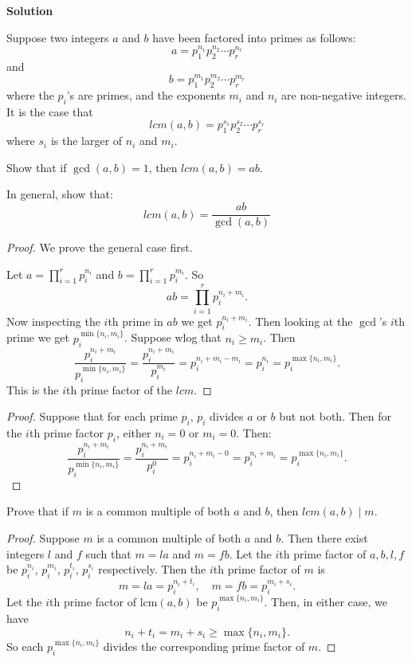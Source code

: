 \documentclass[8pt]{article}
\begin{document}
\textbf{Solution}

Suppose two integers $a$ and $b$ have been factored into primes as follows:
\[a = p_1^{n_1} p_2^{n_2} \cdots p_r^{n_r}\]
and 
\[b = p_1^{m_1} p_2^{m_2} \cdots p_r^{m_r}\]
where the $p_i$'s are primes, and the exponents $m_i$ and $n_i$ are non-negative 
integers. It is the case that 
\[lcm(a, b) = p_1^{s_1} p_2^{s_2} \cdots p_r^{s_r}\]
where $s_i$ is the larger of $n_i$ and $m_i$.

\begin{tcolorbox}[title=Problem 12, breakable]
    Show that if $\gcd(a, b) = 1$, then $lcm(a, b) = ab$.

    In general, show that:
    \[lcm(a, b) = \frac{ab}{\gcd(a, b)}\]
\end{tcolorbox}

\begin{proof}
    We prove the general case first.

    Let $a = \prod_{i=1}^r p_i^{n_i}$ and $b = \prod_{i=1}^r p_i^{m_i}$.
    So 
    \[
        ab = \prod_{i=1}^r p_i^{n_i+m_i}.
    \]
    Now inspecting the $i$th prime in $ab$ we get $p_i^{n_i + m_i}$.
    Then looking at the $\operatorname{\gcd}$'s $i$th prime we get $p_i^{\min\{n_i, m_i\}}$.
    Suppose wlog that $n_i \geq m_i$.
    Then 
    \[
        \frac{p_i^{n_i + m_i}}{p_i^{\min\{n_i, m_i\}}} 
        = \frac{p_i^{n_i + m_i}}{p_i^{m_i}}
        = p_i^{n_i + m_i - m_i}
        = p_i^{n_i}
        = p_i^{\max\{n_i, m_i\}}.
    \]
    This is the $i$th prime factor of the $lcm$.
\end{proof}

\begin{proof}
    Suppose that for each prime $p_i$, $p_i$ divides $a$ or $b$ but not both.  
    Then for the $i$th prime factor $p_i$, either $n_i = 0$ or $m_i = 0$. 
    Then:
    \[
        \frac{p_i^{n_i + m_i}}{p_i^{\min\{n_i, m_i\}}} 
        = \frac{p_i^{n_i + m_i}}{p_i^0}
        = p_i^{n_i + m_i - 0}
        = p_i^{n_i + m_i}
        = p_i^{\max\{n_i, m_i\}}.
    \]
\end{proof}

\begin{tcolorbox}[title=Problem 13, breakable]
    Prove that if $m$ is a common multiple of both $a$ and $b$, then 
    $lcm(a, b) \mid m$.
\end{tcolorbox}

\begin{proof}
Suppose $m$ is a common multiple of both $a$ and $b$.
Then there exist integers $l$ and $f$ such that $m = la$ and $m = fb$.
Let the $i$th prime factor of $a, b, l, f$ be 
    $p_i^{n_i}$, $p_i^{m_i}$, $p_i^{t_i}$, $p_i^{s_i}$ respectively.
Then the $i$th prime factor of $m$ is
\[
m = la = p_i^{n_i+t_i}, \quad
m = fb = p_i^{m_i+s_i}.
\]
Let the $i$th prime factor of $\mathrm{lcm}(a,b)$ be $p_i^{\max\{n_i,m_i\}}$.
Then, in either case, we have
\[
n_i+t_i = m_i+s_i \ge \max\{n_i,m_i\}.
\]
So each $p_i^{\max\{n_i,m_i\}}$ divides the corresponding prime factor of $m$.
\end{proof}
\end{document}
